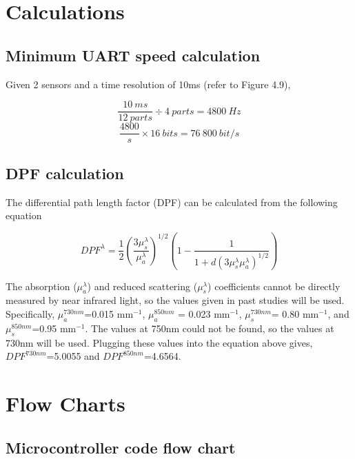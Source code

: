 \appendix

\chapter {Calculations}

\section {Minimum UART speed calculation}

Given 2 sensors and a time resolution of 10ms (refer to Figure 4.9),

\begin{equation}
\frac{10\ ms}{12\ parts} \div 4\ parts = 4800\ Hz
\end{equation}
\begin{equation}
\frac {4800} {s} \times 16\ bits = 76\ 800\ bit/s
\end{equation}

\section {DPF calculation}

The differential path length factor (DPF) can be calculated from the following equation \cite{rosen05}

\begin{equation}
DPF^\lambda = \frac{1}{2}\left(\frac{3\mu_{s}^\lambda}{\mu_{a}^\lambda}\right)^{1/2} \left(1-\frac{1}{1+d(3\mu_{s}^\lambda\mu_{a}^\lambda)^{1/2}}\right)
\end{equation}

The absorption ($\mu_{a}^\lambda$) and reduced scattering ($\mu_{s}^\lambda$) coefficients cannot be directly measured by near infrared light, so the values given in past studies will be used. Specifically, $\mu_{a}^{730nm}$=0.015 mm$^{-1}$, $\mu_{a}^{850nm}$ = 0.023 mm$^{-1}$, $\mu_{s}^{730nm}$= 0.80 mm$^{-1}$, and $\mu_{s}^{850nm}$=0.95 mm$^{-1}$. The values at 750nm could not be found, so the values at 730nm will be used. Plugging these values into the equation above gives, $DPF^{730nm}$=5.0055 and $DPF^{850nm}$=4.6564.

\chapter{Flow Charts}
\section {Microcontroller code flow chart}

